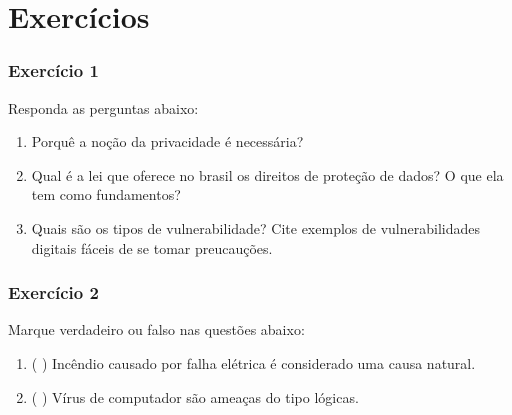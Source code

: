 \chapter{Exercícios}

\subsection*{Exercício 1}

Responda as perguntas abaixo:

\begin{enumerate}
    \item Porquê a noção da privacidade é necessária?
    \item Qual é a lei que oferece no brasil os direitos de proteção de dados? O que ela tem como fundamentos?
    \item Quais são os tipos de vulnerabilidade? Cite exemplos de vulnerabilidades digitais fáceis de se tomar preucauções.
\end{enumerate}

\subsection*{Exercício 2}

Marque verdadeiro ou falso nas questões abaixo:

\begin{enumerate}
    \item ( ) Incêndio causado por falha elétrica é considerado uma causa natural.
    \item ( ) Vírus de computador são ameaças do tipo lógicas.
\end{enumerate}
